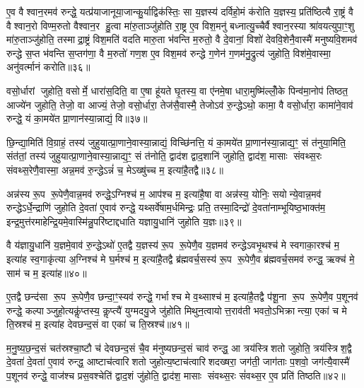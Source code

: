 ए॒व वैश्वान॒रमव॑ रुन्द्धे॒ यत्प्र॑याजानूया॒जान्कु॒र्याद्विक॑स्तिः॒ सा य॒ज्ञस्य॑ दर्विहो॒मं क॑रोति य॒ज्ञस्य॒ प्रति॑ष्ठित्यै रा॒ष्ट्रं वै वैश्वान॒रो विण्म॒रुतो वैश्वान॒र हु॒त्वा मा॑रु॒ताञ्जु॑होति रा॒ष्ट्र ए॒व विश॒मनु॑ बध्नात्यु॒च्चैर्वैश्वान॒रस्या श्रा॑वयत्युपा॒ꣳ॒शु मा॑रु॒ताञ्जु॑होति॒ तस्माद्रा॒ष्ट्रं विश॒मति॑ वदति मारु॒ता भ॑वन्ति म॒रुतो॒ वै दे॒वानां॒ विशो॑ देववि॒शेनै॒वास्मै॑ मनुष्यवि॒शमव॑ रुन्द्धे स॒प्त भ॑वन्ति स॒प्तग॑णा॒ वै म॒रुतो॑ गण॒श ए॒व विश॒मव॑ रुन्द्धे ग॒णेन॑ ग॒णम॑नु॒द्रुत्य॑ जुहोति॒ विश॑मे॒वास्मा॒ अनु॑वर्त्मानं करोति॥३६॥

{\anuvakamend[{अग्ने॒ प्रेह्यव॑ स्म दुहे॒ तां प्र॒जाप॑तेः सा॒ख्षान्म॑नुष्यवि॒शमेक॑विशतिश्च॥७॥}]}

वसो॒र्धारां जुहोति॒ वसोर्मे॒ धारा॑स॒दिति॒ वा ए॒षा हू॑यते घृ॒तस्य॒ वा ए॑नमे॒षा धारा॒मुष्मि॑ल्लोँ॒के पिन्व॑मा॒नोप॑ तिष्ठत॒ आज्ये॑न जुहोति॒ तेजो॒ वा आज्यं॒ तेजो॒ वसो॒र्धारा॒ तेज॑सै॒वास्मै॒ तेजोऽव॑ रु॒न्द्धेऽथो॒ कामा॒ वै वसो॒र्धारा॒ कामा॑ने॒वाव॑ रुन्द्धे॒ यं का॒मये॑त प्रा॒णान॑स्या॒न्नाद्यं॒ वि॥३७॥

छि॒न्द्या॒मिति॑ वि॒ग्राहं॒ तस्य॑ जुहुयात्प्रा॒णाने॒वास्या॒न्नाद्यं॒ विच्छि॑नत्ति॒ यं का॒मये॑त प्रा॒णान॑स्या॒न्नाद्य॒ꣳ॒ सं त॑नुया॒मिति॒ संत॑तां॒ तस्य॑ जुहुयात्प्रा॒णाने॒वास्या॒न्नाद्य॒ꣳ॒ सं त॑नोति॒ द्वाद॑श द्वाद॒शानि॑ जुहोति॒ द्वाद॑श॒ मासाः संवथ्स॒रः संवथ्स॒रेणै॒वास्मा॒ अन्न॒मव॑ रु॒न्द्धेऽन्नं॑ च॒ मेऽख्षु॑च्च म॒ इत्या॑है॒तद्वै॥३८॥

अन्न॑स्य रू॒प रू॒पेणै॒वान्न॒मव॑ रुन्द्धे॒ऽग्निश्च॑ म॒ आप॑श्च म॒ इत्या॑है॒षा वा अन्न॑स्य॒ योनिः॒ सयोन्ये॒वान्न॒मव॑ रुन्द्धेऽर्धे॒न्द्राणि॑ जुहोति दे॒वता॑ ए॒वाव॑ रुन्द्धे॒ यथ्सर्वे॑षाम॒र्धमिन्द्रः॒ प्रति॒ तस्मा॒दिन्द्रो॑ दे॒वता॑नाम्भूयिष्ठ॒भाक्त॑म॒ इन्द्र॒मुत्त॑रमाहेन्द्रि॒यमे॒वास्मि॑न्नु॒परि॑ष्टाद्दधाति यज्ञायु॒धानि॑ जुहोति य॒ज्ञः॥३९॥

वै य॑ज्ञायु॒धानि॑ य॒ज्ञमे॒वाव॑ रु॒न्द्धेऽथो॑ ए॒तद्वै य॒ज्ञस्य॑ रू॒प रू॒पेणै॒व य॒ज्ञमव॑ रुन्द्धेऽवभृ॒थश्च॑ मे स्वगाका॒रश्च॑ म॒ इत्या॑ह स्व॒गाकृ॑त्या अ॒ग्निश्च॑ मे घ॒र्मश्च॑ म॒ इत्या॑है॒तद्वै ब्र॑ह्मवर्च॒सस्य॑ रू॒प रू॒पेणै॒व ब्र॑ह्मवर्च॒समव॑ रुन्द्ध॒ ऋक्च॑ मे॒ साम॑ च म॒ इत्या॑ह॥४०॥

ए॒तद्वै छन्द॑सा रू॒प रू॒पेणै॒व छन्दा॒ꣳ॒स्यव॑ रुन्द्धे॒ गर्भाश्च मे व॒थ्साश्च॑ म॒ इत्या॑है॒तद्वै प॑शू॒ना रू॒प रू॒पेणै॒व प॒शूनव॑ रुन्द्धे॒ कल्पाञ्जुहो॒त्यकॢ॑प्तस्य॒ कॢप्त्यै॑ युग्मदयु॒जे जु॑होति मिथुन॒त्वायोत्त॒राव॑ती भवतो॒ऽभिक्रान्त्या॒ एका॑ च मे ति॒स्रश्च॑ म॒ इत्या॑ह देवछन्द॒सं वा एका॑ च ति॒स्रश्च॑॥४१॥

म॒नु॒ष्य॒छ॒न्द॒सं चत॑स्रश्चा॒ष्टौ च॑ देवछन्द॒सं चै॒व म॑नुष्यछन्द॒सं चाव॑ रुन्द्ध॒ आ त्रय॑स्त्रिशतो जुहोति॒ त्रय॑स्त्रिश॒द्वै दे॒वता॑ दे॒वता॑ ए॒वाव॑ रुन्द्ध॒ आष्टाच॑त्वारिशतो जुहोत्य॒ष्टाच॑त्वारिशदख्षरा॒ जग॑ती॒ जाग॑ताः प॒शवो॒ जग॑त्यै॒वास्मै॑ प॒शूनव॑ रुन्द्धे॒ वाज॑श्च प्रस॒वश्चेति॑ द्वाद॒शं जु॑होति॒ द्वाद॑श॒ मासाः संवथ्स॒रः सं॑वथ्स॒र ए॒व प्रति॑ तिष्ठति॥४२॥

